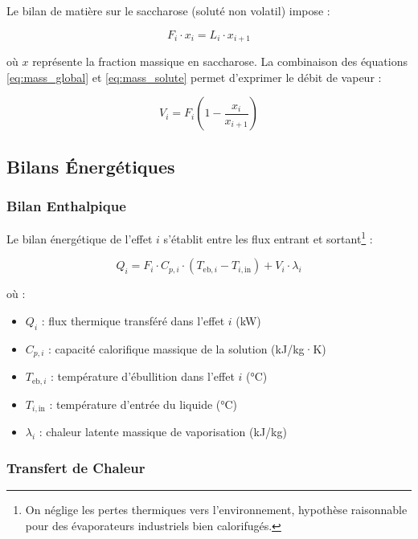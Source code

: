 \documentclass[12pt,a4paper,twoside]{article}
\begin{document}
Le bilan de matière sur le saccharose (soluté non volatil) impose :

\begin{equation}
F_i \cdot x_i = L_i \cdot x_{i+1}
\label{eq:mass_solute}
\end{equation}

où $x$ représente la fraction massique en saccharose. La combinaison des équations \eqref{eq:mass_global} et \eqref{eq:mass_solute} permet d'exprimer le débit de vapeur :

\begin{equation}
\boxed{V_i = F_i \left(1 - \frac{x_i}{x_{i+1}}\right)}
\label{eq:vapor_flow}
\end{equation}

\subsection{Bilans Énergétiques}

\subsubsection{Bilan Enthalpique}

Le bilan énergétique de l'effet $i$ s'établit entre les flux entrant et sortant\footnote{On néglige les pertes thermiques vers l'environnement, hypothèse raisonnable pour des évaporateurs industriels bien calorifugés.} :

\begin{equation}
\boxed{Q_i = F_i \cdot C_{p,i} \cdot (T_{\text{eb},i} - T_{i,\text{in}}) + V_i \cdot \lambda_i}
\label{eq:energy_balance}
\end{equation}

où :
\begin{itemize}[noitemsep]
    \item $Q_i$ : flux thermique transféré dans l'effet $i$ (kW)
    \item $C_{p,i}$ : capacité calorifique massique de la solution (kJ/kg·K)
    \item $T_{\text{eb},i}$ : température d'ébullition dans l'effet $i$ (°C)
    \item $T_{i,\text{in}}$ : température d'entrée du liquide (°C)
    \item $\lambda_i$ : chaleur latente massique de vaporisation (kJ/kg)
\end{itemize}

\subsubsection{Transfert de Chaleur}
\end{document}
